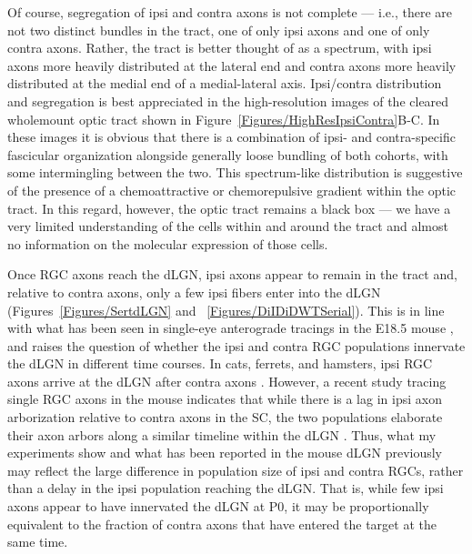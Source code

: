 Of course, segregation of ipsi and contra axons is not complete --- i.e., there are not two distinct bundles in the tract, one of only ipsi axons and one of only contra axons.
Rather, the tract is better thought of as a spectrum, with ipsi axons more heavily distributed at the lateral end and contra axons more heavily distributed at the medial end of a medial-lateral axis.
Ipsi/contra distribution and segregation is best appreciated in the high-resolution images of the cleared wholemount optic tract shown in Figure~\ref{Figures/HighResIpsiContra}B-C.
In these images it is obvious that there is a combination of ipsi- and contra-specific fascicular organization alongside generally loose bundling of both cohorts, with some intermingling between the two.
This spectrum-like distribution is suggestive of the presence of a chemoattractive or chemorepulsive gradient within the optic tract.
In this regard, however, the optic tract remains a black box --- we have a very limited understanding of the cells within and around the tract and almost no information on the molecular expression of those cells.

Once RGC axons reach the dLGN, ipsi axons appear to remain in the tract and, relative to contra axons, only a few ipsi fibers enter into the dLGN (Figures~\ref{Figures/SertdLGN} and ~\ref{Figures/DiIDiDWTSerial}).
This is in line with what has been seen in single-eye anterograde tracings in the E18.5 mouse \cite{godement1984prenatal}, and raises the question of whether the ipsi and contra RGC populations innervate the dLGN in different time courses.
In cats, ferrets, and hamsters, ipsi RGC axons arrive at the dLGN after contra axons \cite{frost1979postnatal,linden1981dorsal,shatz1983prenatal}.
However, a recent study tracing single RGC axons in the mouse indicates that while there is a lag in ipsi axon arborization relative to contra axons in the SC, the two populations elaborate their axon arbors along a similar timeline within the dLGN \cite{dhande2011development}.
Thus, what my experiments show and what has been reported in the mouse dLGN previously \cite{godement1984prenatal} may reflect the large difference in population size of ipsi and contra RGCs, rather than a delay in the ipsi population reaching the dLGN.
That is, while few ipsi axons appear to have innervated the dLGN at P0, it may be proportionally equivalent to the fraction of contra axons that have entered the target at the same time.